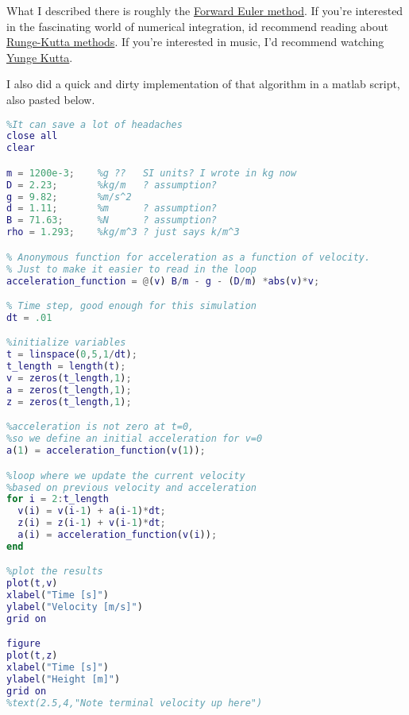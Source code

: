 \documentclass{article}
\begin{document}
What I described there is roughly the \href{https://en.wikipedia.org/wiki/Euler\_method}{Forward Euler method}. If you're interested in the fascinating world of numerical integration, id recommend reading about \href{https://en.wikipedia.org/wiki/Runge%E2%80%93Kutta_methods}{Runge-Kutta methods}. If you're interested in music, I'd recommend watching \href{https://www.youtube.com/watch?v=eJxZQ6f37zY&t=2s}{Yunge Kutta}.

I also did a quick and dirty implementation of that algorithm in a matlab script, also pasted below. 


\newpage
\begin{lstlisting}[language = matlab]
%I usually close and clear at start of main script,
%It can save a lot of headaches
close all
clear

m = 1200e-3;    %g ??   SI units? I wrote in kg now
D = 2.23;       %kg/m   ? assumption?
g = 9.82;       %m/s^2
d = 1.11;       %m      ? assumption?
B = 71.63;      %N      ? assumption?
rho = 1.293;    %kg/m^3 ? just says k/m^3

% Anonymous function for acceleration as a function of velocity.
% Just to make it easier to read in the loop
acceleration_function = @(v) B/m - g - (D/m) *abs(v)*v;

% Time step, good enough for this simulation
dt = .01

%initialize variables
t = linspace(0,5,1/dt);
t_length = length(t);
v = zeros(t_length,1);
a = zeros(t_length,1);
z = zeros(t_length,1);

%acceleration is not zero at t=0,
%so we define an initial acceleration for v=0
a(1) = acceleration_function(v(1));

%loop where we update the current velocity
%based on previous velocity and acceleration
for i = 2:t_length
  v(i) = v(i-1) + a(i-1)*dt;
  z(i) = z(i-1) + v(i-1)*dt;
  a(i) = acceleration_function(v(i));
end

%plot the results
plot(t,v)
xlabel("Time [s]")
ylabel("Velocity [m/s]")
grid on

figure
plot(t,z)
xlabel("Time [s]")
ylabel("Height [m]")
grid on
%text(2.5,4,"Note terminal velocity up here")
\end{lstlisting}
\end{document}
